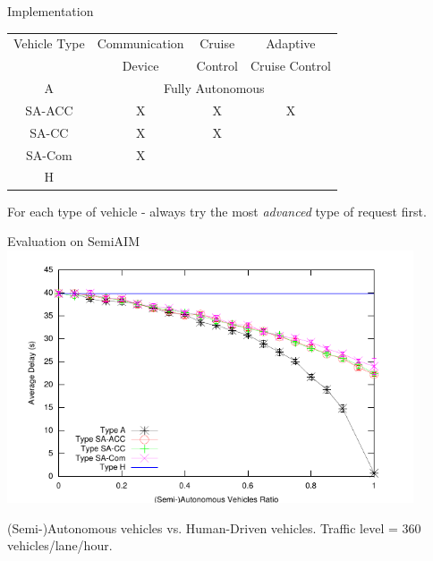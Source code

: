 \documentclass{beamer}
\begin{document}
\begin{frame}{Implementation}
\begin{tabular}{|c|c|c|c|}
  \hline
  Vehicle Type & Communication & Cruise & Adaptive \\
               & Device & Control & Cruise Control \\
  \hline
  A & \multicolumn{3}{|c|}{Fully Autonomous} \\
  \hline
  SA-ACC & X & X & X  \\
  \hline
  SA-CC & X & X &  \\
  \hline
  SA-Com & X & &  \\
  \hline
  H & & & \\
  \hline
\end{tabular}

\hfill

For each type of vehicle - always try the most \emph{advanced} type of
request first.
\end{frame}

\begin{frame}{Evaluation on SemiAIM}
\includegraphics[width=0.9\textwidth]{figures/figure_1.pdf}

(Semi-)Autonomous vehicles vs. Human-Driven vehicles. Traffic
level = 360 vehicles/lane/hour.
\end{frame}
\end{document}
